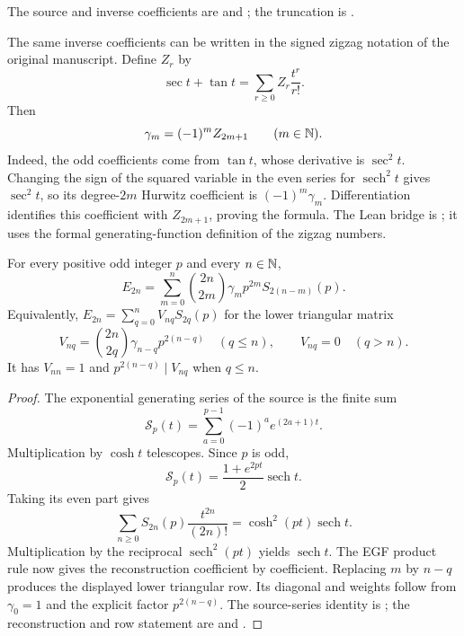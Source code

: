 The source and inverse coefficients are
 and
; the truncation is
.

The same inverse coefficients can be written in the signed zigzag notation
of the original manuscript.  Define $Z_r$ by
\[
 \sec t+\tan t=\sum_{r\ge0}Z_r\frac{t^r}{r!}.
\]
Then
\begin{equation}\label{eq:arith-signed-zigzag}
 \gamma_m=(-1)^m Z_{2m+1}\qquad(m\in\mathbb N).
\end{equation}
Indeed, the odd coefficients come from $\tan t$, whose derivative is
$\sec^2t$.  Changing the sign of the squared variable in the even series
for $\operatorname{sech}^2t$ gives $\sec^2t$, so its degree-$2m$
Hurwitz coefficient is $(-1)^m\gamma_m$.  Differentiation identifies
this coefficient with $Z_{2m+1}$, proving the formula.  The Lean bridge is
; it uses the
formal generating-function definition of the zigzag numbers.

\begin{theorem}
\label{thm:arith-odd-reconstruction}
For every positive odd integer $p$ and every $n\in\mathbb N$,
\[
 E_{2n}=\sum_{m=0}^{n}\binom{2n}{2m}\gamma_m p^{2m}S_{2(n-m)}(p).
\]
Equivalently, $E_{2n}=\sum_{q=0}^n V_{nq}S_{2q}(p)$ for the lower
triangular matrix
\[
 V_{nq}=\binom{2n}{2q}\gamma_{n-q}p^{2(n-q)}\quad(q\le n),
 \qquad V_{nq}=0\quad(q>n).
\]
It has $V_{nn}=1$ and $p^{2(n-q)}\mid V_{nq}$ when $q\le n$.
\end{theorem}

\begin{proof}
The exponential generating series of the source is the finite sum
\[
 \mathcal S_p(t)=\sum_{a=0}^{p-1}(-1)^a e^{(2a+1)t}.
\]
Multiplication by $\cosh t$ telescopes.  Since $p$ is odd,
\[
 \mathcal S_p(t)=\frac{1+e^{2pt}}{2}\operatorname{sech}t.
\]
Taking its even part gives
\[
 \sum_{n\ge0}S_{2n}(p)\frac{t^{2n}}{(2n)!}
       =\cosh^2(pt)\operatorname{sech}t.
\]
Multiplication by the reciprocal $\operatorname{sech}^2(pt)$
yields $\operatorname{sech}t$.  The EGF product rule now gives the
reconstruction coefficient by coefficient.  Replacing $m$ by $n-q$
produces the displayed lower triangular row.  Its diagonal and weights
follow from $\gamma_0=1$ and the explicit factor $p^{2(n-q)}$.
The source-series identity is
; the reconstruction
and row statement are
 and
.
\end{proof}

